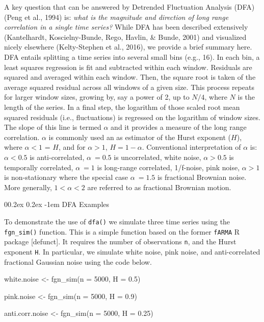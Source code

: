 \documentclass[
  man]{apa6}
\makeatletter
\newenvironment{Shaded}{\begin{snugshade}}{\end{snugshade}}
\newcommand{\AttributeTok}[1]{\textcolor[rgb]{0.77,0.63,0.00}{#1}}
\newcommand{\DecValTok}[1]{\textcolor[rgb]{0.00,0.00,0.81}{#1}}
\newcommand{\FloatTok}[1]{\textcolor[rgb]{0.00,0.00,0.81}{#1}}
\newcommand{\FunctionTok}[1]{\textcolor[rgb]{0.00,0.00,0.00}{#1}}
\newcommand{\NormalTok}[1]{#1}
\newcommand{\OtherTok}[1]{\textcolor[rgb]{0.56,0.35,0.01}{#1}}
\let\oldparagraph\paragraph
\renewcommand{\paragraph}[1]{\oldparagraph{#1}\mbox{}}
\renewcommand{\paragraph}{\@startsection{paragraph}{4}{\parindent}%
  {0\baselineskip \@plus 0.2ex \@minus 0.2ex}%
  {-1em}%
  {\normalfont\normalsize\bfseries\itshape\typesectitle}}
\makeatother
\begin{document}
A key question that can be answered by Detrended Fluctuation Analysis
(DFA) (Peng et al., 1994) is: \emph{what is the magnitude and
direction of long range correlation in a single time series?} While DFA
has been described extensively
(Kantelhardt, Koscielny-Bunde, Rego, Havlin, \& Bunde, 2001) and visualized nicely
elsewhere (Kelty-Stephen et al., 2016), we
provide a brief summary here. DFA entails splitting a time series into
several small bins (e.g., 16). In each bin, a least squares regression
is fit and subtracted within each window. Residuals are squared and
averaged within each window. Then, the square root is taken of the
average squared residual across all windows of a given size. This
process repeats for larger window sizes, growing by, say a power of 2,
up to \(N/4\), where \(N\) is the length of the series. In a final step, the
logarithm of those scaled root mean squared residuals (i.e.,
fluctuations) is regressed on the logarithm of window sizes. The slope
of this line is termed \(\alpha\) and it provides a measure of the long
range correlation. \(\alpha\) is commonly used an as estimator of the
Hurst exponent (\(H\)), where \(\alpha<1\) = \(H\), and for \(\alpha>1\),
\(H = 1 - \alpha\). Conventional interpretation of \(\alpha\) is:
\(\alpha < 0.5\) is anti-correlated, \(\alpha ~= 0.5\) is uncorrelated,
white noise, \(\alpha > 0.5\) is temporally correlated, \(\alpha ~= 1\) is
long-range correlated, 1/f-noise, pink noise, \(\alpha > 1\) is
non-stationary where the special case \(\alpha ~= 1.5\) is fractional
Brownian noise. More generally, \(1<\alpha<2\) are referred to as
fractional Brownian motion.

\hypertarget{dfa-examples}{%
\paragraph{DFA Examples}\label{dfa-examples}}

To demonstrate the use of \texttt{dfa()} we simulate three time series using
the \texttt{fgn\_sim()} function. This is a simple function based on the former
\texttt{fARMA} R package {[}defunct{]}. It requires the number of observations \texttt{n},
and the Hurst exponent \texttt{H}. In particular, we simulate white noise, pink
noise, and anti-correlated fractional Gaussian noise using the code
below.

\begin{Shaded}
\begin{Highlighting}[]
\NormalTok{white.noise }\OtherTok{\textless{}{-}} \FunctionTok{fgn\_sim}\NormalTok{(}\AttributeTok{n =} \DecValTok{5000}\NormalTok{, }\AttributeTok{H =} \FloatTok{0.5}\NormalTok{)}

\NormalTok{pink.noise }\OtherTok{\textless{}{-}} \FunctionTok{fgn\_sim}\NormalTok{(}\AttributeTok{n =} \DecValTok{5000}\NormalTok{, }\AttributeTok{H =} \FloatTok{0.9}\NormalTok{)}

\NormalTok{anti.corr.noise }\OtherTok{\textless{}{-}} \FunctionTok{fgn\_sim}\NormalTok{(}\AttributeTok{n =} \DecValTok{5000}\NormalTok{, }\AttributeTok{H =} \FloatTok{0.25}\NormalTok{)}
\end{Highlighting}
\end{Shaded}
\end{document}
